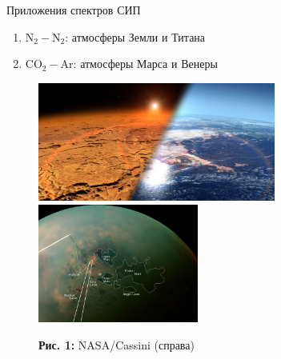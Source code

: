 \documentclass[10pt,usenames,pdf,hyperref={unicode},dvipsnames]{beamer}
\newcommand{\mycaption}[2]{
    \textbf{#1:} #2
}
\begin{document}
\begin{frame}{Приложения спектров СИП}
    \vspace*{-0.1cm}
    \begin{enumerate}
        \item N$_2-$N$_2$: атмосферы Земли и Титана  \\
        \item CO$_2-$Ar: атмосферы Марса и Венеры  \\
    \end{enumerate}

    \begin{figure}[H]
        \includegraphics[width=0.49\linewidth, height = 3.9cm]{./pictures/early_mars.jpeg}
        \includegraphics[width=0.49\linewidth, height = 3.9cm]{./pictures/titan.jpg}
        \mycaption{Рис. 1}{NASA/Cassini (справа)}
    \end{figure}
\end{frame}
\end{document}
